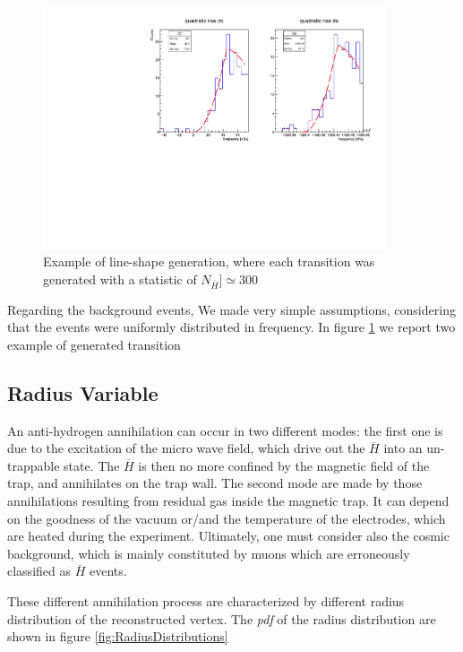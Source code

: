\documentclass[11pt,a4paper,oneside]{article}
\newcommand{\commento}[1]{{\color{purple}{#1}}\vspace{10pt}}
\begin{document}
\begin{figure}[!hbtp]
\centering
\includegraphics[width = 0.9\textwidth]{examplePasscut.pdf}
\caption{Example of line-shape generation, where each transition was generated with a statistic of $N_{\overline{H}}] \simeq 300 $}
\label{fig:ExampleGen}
\end{figure}

Regarding the background events, We made very simple assumptions, considering that the events were uniformly distributed in frequency. In figure \ref{fig:ExampleGen} we report two example of generated transition

\subsection{Radius Variable}

\commento{complete, are we planning to do something with radius? For instance a likelihood ratio to cut out background.}

An anti-hydrogen annihilation can occur in two different modes: the first one is due to the excitation of the micro wave field, which drive out the $\overline{H}$ into an un-trappable state. The $\overline{H}$ is then no more confined by the magnetic field of the trap, and annihilates on the trap wall. The second mode are made by those annihilations resulting from residual gas inside the magnetic trap. It can depend on the goodness of the vacuum or/and the temperature of the electrodes, which are heated during the experiment. Ultimately, one must consider also the cosmic background, which is mainly constituted by muons which are erroneously classified as $\overline{H}$ events. 

These different annihilation process are characterized by different radius distribution of the reconstructed vertex. The \textit{pdf} of the radius distribution are shown in figure \ref{fig:RadiusDistributions}
\end{document}
